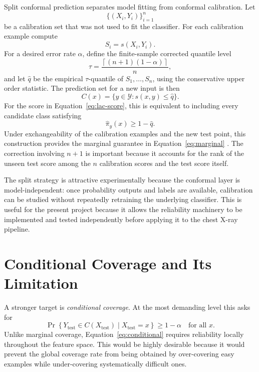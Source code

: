 \documentclass[12pt,a4paper]{article}
\begin{document}
Split conformal prediction separates model fitting from conformal calibration. Let
\[
\{(X_i,Y_i)\}_{i=1}^{n}
\]
be a calibration set that was not used to fit the classifier. For each calibration example compute
\[
S_i=s(X_i,Y_i).
\]
For a desired error rate $\alpha$, define the finite-sample corrected quantile level
\begin{equation}
    \tau = \frac{\left\lceil(n+1)(1-\alpha)\right\rceil}{n},
    \label{eq:quantile-level}
\end{equation}
and let $\hat q$ be the empirical $\tau$-quantile of $S_1,\ldots,S_n$, using the conservative upper order statistic. The prediction set for a new input is then
\begin{equation}
    C(x)=\{y\in\mathcal{Y}:s(x,y)\leq \hat q\}.
    \label{eq:prediction-set}
\end{equation}
For the score in Equation~\eqref{eq:lac-score}, this is equivalent to including every candidate class satisfying
\[
\hat\pi_y(x)\geq 1-\hat q.
\]
Under exchangeability of the calibration examples and the new test point, this construction provides the marginal guarantee in Equation~\eqref{eq:marginal} \cite{angelopoulos2023gentle,romano2020classification}. The correction involving $n+1$ is important because it accounts for the rank of the unseen test score among the $n$ calibration scores and the test score itself.

The split strategy is attractive experimentally because the conformal layer is model-independent: once probability outputs and labels are available, calibration can be studied without repeatedly retraining the underlying classifier. This is useful for the present project because it allows the reliability machinery to be implemented and tested independently before applying it to the chest X-ray pipeline.

\section{Conditional Coverage and Its Limitation}

A stronger target is \emph{conditional coverage}. At the most demanding level this asks for
\begin{equation}
    \Pr\!\left\{Y_{\mathrm{test}}\in C(X_{\mathrm{test}})\mid X_{\mathrm{test}}=x\right\}
    \geq 1-\alpha
    \quad\text{for all }x.
    \label{eq:conditional}
\end{equation}
Unlike marginal coverage, Equation~\eqref{eq:conditional} requires reliability locally throughout the feature space. This would be highly desirable because it would prevent the global coverage rate from being obtained by over-covering easy examples while under-covering systematically difficult ones.
\end{document}
